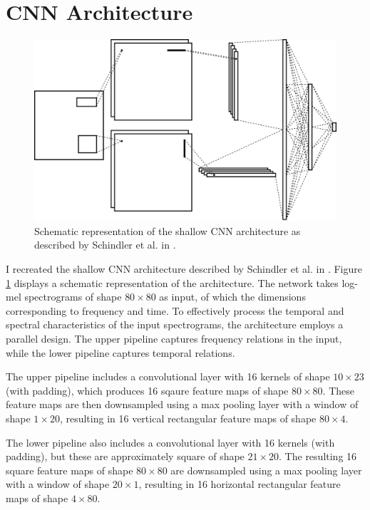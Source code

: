 \documentclass[conference]{IEEEtran}
\begin{document}
\section{CNN Architecture}

\begin{figure}[htbp]
    \centerline{\includegraphics[width=\columnwidth]{architecture.jpg}}
    \caption{Schematic representation of the shallow CNN architecture as described by Schindler et al. in \cite{SchindlerLidyRauber}.}
    \label{architecture}
\end{figure}

I recreated the shallow CNN architecture described by Schindler et al. in \cite{SchindlerLidyRauber}.
Figure \ref{architecture} displays a schematic representation of the architecture.
The network takes log-mel spectrograms of shape $80\times80$ as input, of which the dimensions corresponding to frequency and time.
To effectively process the temporal and spectral characteristics of the input spectrograms, the architecture employs a parallel design.
The upper pipeline captures frequency relations in the input, while the lower pipeline captures temporal relations.

The upper pipeline includes a convolutional layer with 16 kernels of shape $10\times23$ (with padding), which produces 16 sqaure feature maps of shape $80\times80$.
These feature maps are then downsampled using a max pooling layer with a window of shape $1\times20$, resulting in 16 vertical rectangular feature maps of shape $80\times4$.

The lower pipeline also includes a convolutional layer with 16 kernels (with padding), but these are approximately square of shape $21\times20$.
The resulting 16 square feature maps of shape $80\times80$ are downsampled using a max pooling layer with a window of shape $20\times1$, resulting in 16 horizontal rectangular feature maps of shape $4\times80$.
\end{document}
